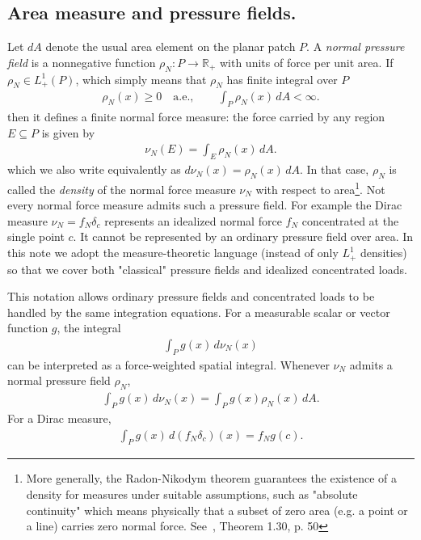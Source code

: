 \documentclass[11pt,a4paper]{article}
\theoremstyle{plain}
\begin{document}
\subsection{Area measure and pressure fields.}
Let $dA$ denote the usual area element on the planar patch $P$.
A \textit{normal pressure field} is a nonnegative function $\rho_N:P\rightarrow\mathbb R_+$ with units of force per unit area. If $\rho_N\in L^1_+(P)$, which simply means that $\rho_N$ has finite integral over $P$
\begin{align}
\rho_N(x)\ge 0\quad\text{a.e.},
\qquad
\int_P \rho_N(x)\,dA<\infty.
\end{align}
then it defines a finite normal force measure: the force carried by any region $E\subseteq P$ is given by
\begin{align}
\nu_N(E) = \int_E \rho_N(x)\,dA.
\end{align}
which we also write equivalently as $d\nu_N(x)=\rho_N(x)\,dA$. In that case, $\rho_N$ is called the \textit{density} of the normal force measure $\nu_N$ with respect to area\footnote{More generally, the Radon-Nikodym theorem guarantees the existence of a density for measures under suitable assumptions, such as "absolute continuity" which means physically that a subset of zero area (e.g. a point or a line) carries zero normal force. See~\cite{evans2015measure}, Theorem 1.30, p. 50}. Not every normal force measure admits such a pressure field. For example the Dirac measure $\nu_N=f_N\delta_c$ represents an idealized normal force $f_N$ concentrated at the single point $c$. It cannot be represented by an ordinary pressure field over area. In this note we adopt the measure-theoretic language (instead of only $L_+^1$ densities) so that we cover both "classical" pressure fields and idealized concentrated loads.

This notation allows ordinary pressure fields and concentrated loads to be handled by the same integration equations. For a measurable scalar or vector function $g$, the integral 
\begin{align}
\int_P g(x)\,d\nu_N(x)
\end{align}
can be interpreted as a force-weighted spatial integral. 
Whenever $\nu_N$ admits a normal pressure field $\rho_N$,
\begin{align}
\int_P g(x)\,d\nu_N(x) = \int_P g(x)\rho_N(x)\,dA.
\end{align} 
For a Dirac measure,
\begin{align}
\int_P g(x)\,d(f_N\delta_c)(x) = f_Ng(c).
\end{align}
\end{document}
